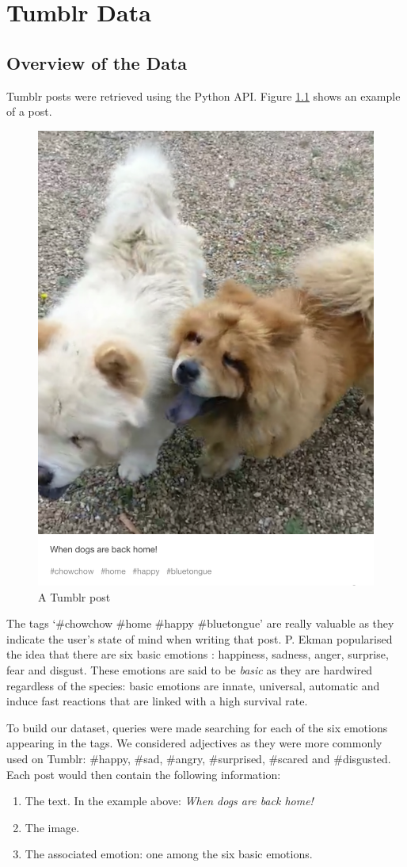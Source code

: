 \chapter{Tumblr Data}

\section{Overview of the Data}
Tumblr posts were retrieved using the Python API. Figure \ref{example-tumblr} shows an example of a post.
\begin{figure}[H]
\centering
\includegraphics[width=.58\textwidth]{Images/chowchow.png}
\caption{A Tumblr post}
\label{example-tumblr}
\end{figure}

The tags `\#chowchow \#home \#happy \#bluetongue' are really valuable as they indicate the user's state of mind when writing that post. P. Ekman popularised the idea that there are six basic emotions \cite{ekman}: happiness, sadness, anger, surprise, fear and disgust. These emotions are said to be {\em basic} as they are hardwired regardless of the species: basic emotions are innate, universal, automatic and induce fast reactions that are linked with a high survival rate.

To build our dataset, queries were made searching for each of the six emotions appearing in the tags. We considered adjectives as they were more commonly used on Tumblr: \#happy, \#sad, \#angry, \#surprised, \#scared and \#disgusted. Each post would then contain the following information:
\begin{enumerate}
\item The text. In the example above: \textit{When dogs are back home!}
\item The image.
\item The associated emotion: one among the six basic emotions.
\end{enumerate}

